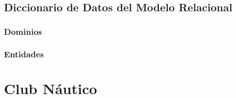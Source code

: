 \documentclass[12pt]{article}
\begin{document}
{\begin{landscape}
    \subsection{Diccionario de Datos del Modelo Relacional}
    
    \subsubsection{Dominios}
    \begin{center}
        
    \end{center}
    
    \subsubsection{Entidades}
    \begin{center}
        
    \end{center}
    
    \end{landscape}
}

\newpage
\section{Club Náutico}


\end{document}
